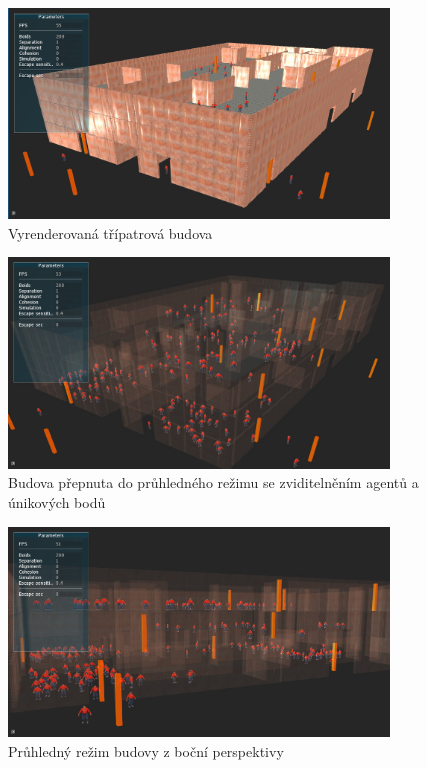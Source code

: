 \documentclass[czech,public,dept460,male,cpdeclaration]{diploma}
\begin{document}
\newpage

\begin{figure}[H]\centering\includegraphics[width=0.9\textwidth]{Figures/screen1.jpg}
	\caption{Vyrenderovaná třípatrová budova}
\end{figure}

\begin{figure}[H]\centering\includegraphics[width=0.9\textwidth]{Figures/screen4.jpg}
	\caption{Budova přepnuta do průhledného režimu se zviditelněním agentů a únikových bodů}
\end{figure}

\begin{figure}[H]\centering\includegraphics[width=0.9\textwidth]{Figures/screen3.jpg}
	\caption{Průhledný režim budovy z boční perspektivy}
\end{figure}
\end{document}
